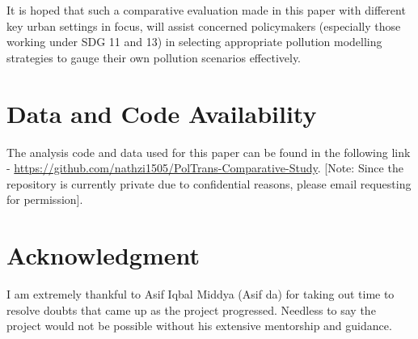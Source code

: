 \documentclass[10pt,journal]{IEEEtran}
\begin{document}
It is hoped that such a comparative evaluation made in this paper with different key urban settings in focus, will assist concerned policymakers (especially those working under SDG 11 and 13) in selecting appropriate pollution modelling strategies to gauge their own pollution scenarios effectively.

\section*{Data and Code Availability}
The analysis code and data used for this paper can be found in the following link - \url{https://github.com/nathzi1505/PolTrans-Comparative-Study}. [Note: Since the repository is currently private due to confidential reasons, please email requesting for permission].

\section*{Acknowledgment}
I am extremely thankful to Asif Iqbal Middya (Asif da) for taking out time to resolve doubts that came up as the project progressed. Needless to say the project would not be possible without his extensive mentorship and guidance. 

\ifCLASSOPTIONcaptionsoff
\newpage
\fi



\end{document}
